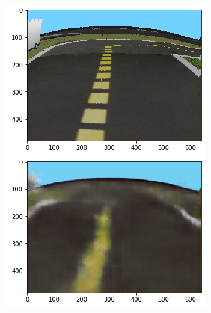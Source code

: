 \documentclass{article}
\begin{document}
\begin{figure}[!ht]
    \centering
    \begin{subfigure}[b]{.24\textwidth}
        \includegraphics[width=\textwidth]{vae1.png}
    \end{subfigure}
    \begin{subfigure}[b]{.24\textwidth}

\end{subfigure}
\end{figure}
\end{document}
